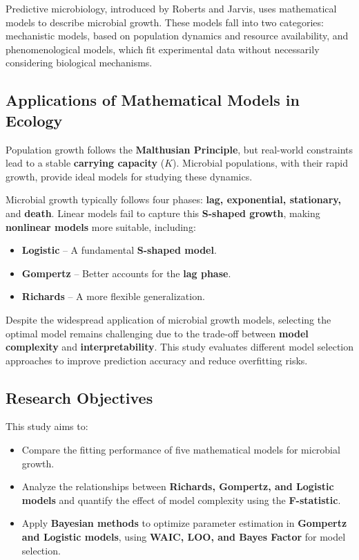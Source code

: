 \documentclass{article}
\begin{document}
Predictive microbiology, introduced by Roberts and Jarvis, uses mathematical models to describe microbial growth. These models fall into two categories: mechanistic models, based on population dynamics and resource availability, and phenomenological models, which fit experimental data without necessarily considering biological mechanisms.

\subsection{Applications of Mathematical Models in Ecology}

Population growth follows the \textbf{Malthusian Principle}, but real-world constraints lead to a stable \textbf{carrying capacity} (\(K\)). Microbial populations, with their rapid growth, provide ideal models for studying these dynamics.

Microbial growth typically follows four phases: \textbf{lag, exponential, stationary,} and \textbf{death}. Linear models fail to capture this \textbf{S-shaped growth}, making \textbf{nonlinear models} more suitable, including:
\begin{itemize}
    \item \textbf{Logistic} – A fundamental \textbf{S-shaped model}.
    \item \textbf{Gompertz} – Better accounts for the \textbf{lag phase}.
    \item \textbf{Richards} – A more flexible generalization.
\end{itemize}

Despite the widespread application of microbial growth models, selecting the optimal model remains challenging due to the trade-off between \textbf{model complexity} and \textbf{interpretability}. This study evaluates different model selection approaches to improve prediction accuracy and reduce overfitting risks.


\subsection{Research Objectives}

This study aims to:
\begin{itemize}
    \item Compare the fitting performance of five mathematical models for microbial growth.
    \item Analyze the relationships between \textbf{Richards, Gompertz, and Logistic models} and quantify the effect of model complexity using the \textbf{F-statistic}.
    \item Apply \textbf{Bayesian methods} to optimize parameter estimation in \textbf{Gompertz and Logistic models}, using \textbf{WAIC, LOO, and Bayes Factor} for model selection.
\end{itemize}
\end{document}

